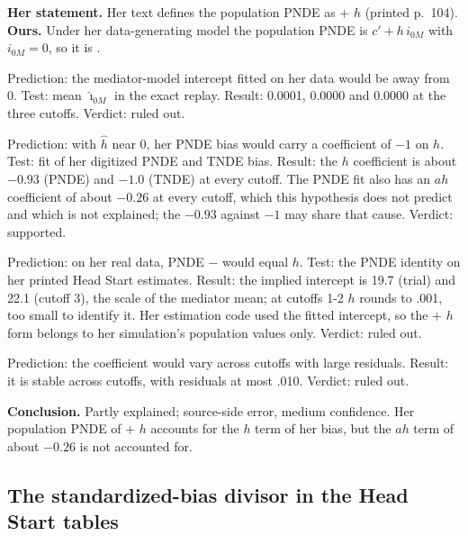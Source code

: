\textbf{Her statement.} Her text defines the population PNDE as \cp{} + $h$ (printed p.~104). \textbf{Ours.} Under her data-generating model the population PNDE is $c' + h\,i_{0M}$ with $i_{0M} = 0$, so it is \cp{}.
\begin{description}[leftmargin=1em,style=nextline]
\item[The mediator intercept is not 0 in her design (ours).] Prediction: the mediator-model intercept fitted on her data would be away from 0. Test: mean $\hat\imath_{0M}$ in the exact replay. Result: 0.0001, 0.0000 and 0.0000 at the three cutoffs. Verdict: ruled out.
\item[She used \cp{} + $h$ as the population value (source).] Prediction: with $\hat h$ near 0, her PNDE bias would carry a coefficient of $-1$ on $h$. Test: fit of her digitized PNDE and TNDE bias. Result: the $h$ coefficient is about $-0.93$ (PNDE) and $-1.0$ (TNDE) at every cutoff. The PNDE fit also has an $ah$ coefficient of about $-0.26$ at every cutoff, which this hypothesis does not predict and which is not explained; the $-0.93$ against $-1$ may share that cause. Verdict: supported.
\item[Her estimation code computes PNDE as \cp{} + $h$ in general (source).] Prediction: on her real data, PNDE $-$ \cp{} would equal $h$. Test: the PNDE identity on her printed Head Start estimates. Result: the implied intercept is 19.7 (trial) and 22.1 (cutoff 3), the scale of the mediator mean; at cutoffs 1-2 $h$ rounds to .001, too small to identify it. Her estimation code used the fitted intercept, so the \cp{} + $h$ form belongs to her simulation's population values only. Verdict: ruled out.
\item[Noise (neither).] Prediction: the coefficient would vary across cutoffs with large residuals. Result: it is stable across cutoffs, with residuals at most .010. Verdict: ruled out.
\end{description}
\textbf{Conclusion.} Partly explained; source-side error, medium confidence. Her population PNDE of \cp{} + $h$ accounts for the $h$ term of her bias, but the $ah$ term of about $-0.26$ is not accounted for.

\subsection{The standardized-bias divisor in the Head Start tables}\label{dis:headstart-sb-divisor}

